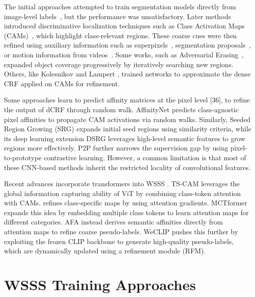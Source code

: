 The initial approaches attempted to train segmentation models directly from image-level labels~\cite{dcnn}, but the performance was unsatisfactory. Later methods introduced discriminative localization techniques such as Class Activation Maps (CAMs)~\cite{cam}, which highlight class-relevant regions. These coarse cues were then refined using auxiliary information such as superpixels~\cite{imagelevelpixel}, segmentation proposals~\cite{imagelevelpixel}, or motion information from videos~\cite{wsss_motion_cues}. Some works, such as Adversarial Erasing~\cite{adversarial_erasing}, expanded object coverage progressively by iteratively searching new regions. Others, like Kolesnikov and Lampert \cite{kolesnikov2016}, trained networks to approximate the dense CRF \cite{krähenbühl} applied on CAMs for refinement.

Some approaches learn to predict affinity matrices at the pixel level [36], to refine the output of dCRF through random walk. AffinityNet \cite{wsss_affinitynet} predicts class-agnostic pixel affinities to propagate CAM activations via random walks. Similarly, Seeded Region Growing (SRG) \cite{srg} expands initial seed regions using similarity criteria, while its deep learning extension DSRG \cite{wsss_dsrg_deep_seeded_region_growing} leverages high-level semantic features to grow regions more effectively. P2P \cite{pixel_to_prototype} further narrows the supervision gap by using pixel-to-prototype contrastive learning. However, a common limitation is that most of these CNN-based methods inherit the restricted locality of convolutional features.

Recent advances incorporate transformers into WSSS \cite{camtokens, getam}. TS-CAM \cite{camtokens} leverages the global information capturing ability of ViT by combining class-token attention with CAMs. \cite{getam} refines class-specific maps by using attention gradients. MCTformer \cite{wsss_MCTformer} expands this idea by embedding multiple class tokens to learn attention maps for different categories. AFA \cite{wsss_afa_affinity_from_attention} instead derives semantic affinities directly from attention maps to refine coarse pseudo-labels. WeCLIP \cite{wsss_frozen_clip} pushes this further by exploiting the frozen CLIP backbone to generate high-quality pseudo-labels, which are dynamically updated using a refinement module (RFM).


\section{WSSS Training Approaches}
\label{sec:stages}

